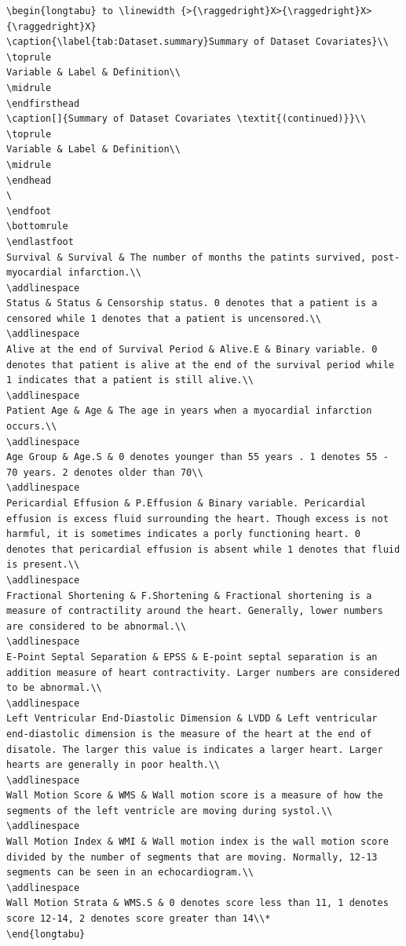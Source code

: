 \documentclass[
]{article}
\begin{document}
\begin{verbatim}
\begin{longtabu} to \linewidth {>{\raggedright}X>{\raggedright}X>{\raggedright}X}
\caption{\label{tab:Dataset.summary}Summary of Dataset Covariates}\\
\toprule
Variable & Label & Definition\\
\midrule
\endfirsthead
\caption[]{Summary of Dataset Covariates \textit{(continued)}}\\
\toprule
Variable & Label & Definition\\
\midrule
\endhead
\
\endfoot
\bottomrule
\endlastfoot
Survival & Survival & The number of months the patints survived, post-myocardial infarction.\\
\addlinespace
Status & Status & Censorship status. 0 denotes that a patient is a censored while 1 denotes that a patient is uncensored.\\
\addlinespace
Alive at the end of Survival Period & Alive.E & Binary variable. 0 denotes that patient is alive at the end of the survival period while 1 indicates that a patient is still alive.\\
\addlinespace
Patient Age & Age & The age in years when a myocardial infarction occurs.\\
\addlinespace
Age Group & Age.S & 0 denotes younger than 55 years . 1 denotes 55 - 70 years. 2 denotes older than 70\\
\addlinespace
Pericardial Effusion & P.Effusion & Binary variable. Pericardial effusion is excess fluid surrounding the heart. Though excess is not harmful, it is sometimes indicates a porly functioning heart. 0 denotes that pericardial effusion is absent while 1 denotes that fluid is present.\\
\addlinespace
Fractional Shortening & F.Shortening & Fractional shortening is a measure of contractility around the heart. Generally, lower numbers are considered to be abnormal.\\
\addlinespace
E-Point Septal Separation & EPSS & E-point septal separation is an addition measure of heart contractivity. Larger numbers are considered to be abnormal.\\
\addlinespace
Left Ventricular End-Diastolic Dimension & LVDD & Left ventricular end-diastolic dimension is the measure of the heart at the end of disatole. The larger this value is indicates a larger heart. Larger hearts are generally in poor health.\\
\addlinespace
Wall Motion Score & WMS & Wall motion score is a measure of how the segments of the left ventricle are moving during systol.\\
\addlinespace
Wall Motion Index & WMI & Wall motion index is the wall motion score divided by the number of segments that are moving. Normally, 12-13 segments can be seen in an echocardiogram.\\
\addlinespace
Wall Motion Strata & WMS.S & 0 denotes score less than 11, 1 denotes score 12-14, 2 denotes score greater than 14\\*
\end{longtabu}



\end{verbatim}
\end{document}
